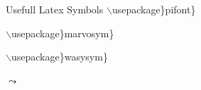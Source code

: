 \documentclass{beamer}
\begin{document}
\begin{frame}{Usefull Latex Symbols}
	$\backslash$usepackage\}\alert{pifont}\}\par
	{}{}{}{}{}{}
	{}{}{}{}{}{}
	{}{}{}{}{}{}
		
	$\backslash$usepackage\}\alert{marvosym}\}\par
	{\EUR}{\EURcr}{\EURdig}{\EURhv}{\EURtm}{\EyesDollar}{\Moon}{\Sun}{\Aries}
	{\Cancer}{\Libra}{\Capricorn}{\Taurus}{\Leo}{\Scorpio}{\Aquarius}{\Gemini}
	{\Virgo}{\Sagittarius}{\Pisces}{\Hexasteel}{\Octosteel}{\Rectpipe}
	{\Rectsteel}{\Squarepipe}{\Squaresteel}{\FEMALE}{\Female}{\Male}{\MALE}
	{\Biohazard}{\CEsign}{\Radioactivity}{\Stopsign}{\Forward}{\MoveDown}
	{\MoveUp}{\Rewind}{\ToTop}{\ForwardToEnd}{\RewindToStart}{\ToBottom}
	{\RewindToIndex}{\ForwardToIndex}{\ClockLogo}{\Coffeecup}{\PackingWaste}
	{\Recycling}

	$\backslash$usepackage\}\alert{wasysym}\}\par
	{$\leadsto$}
	{\mercury}{\earth}{\jupiter}{\uranus}{\pluto}{\venus}{\mars}{\saturn}
	{\neptune}{\astrosun}{\fullmoon}{\leftmoon}{\newmoon}{\rightmoon}{\aries}
	{\cancer}{\libra}{\aquarius}{\taurus}{\leo}{\scorpio}{\capricornus}
	{\gemini}{\virgo}{\sagittarius}{\pisces}{\ascnode}{\descnode}{\conjunction}
	{\opposition}{\vernal}{\female}{\male}{\CheckedBox}{\Square}{\XBox}
	{\blacksmiley}{\smiley}
\end{frame}
\end{document}
